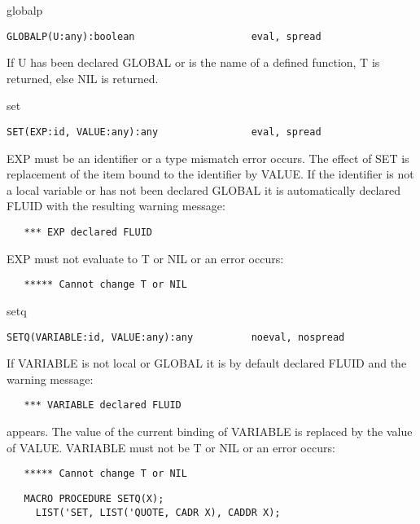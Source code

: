 \begin{Function}{globalp}
\begin{verbatim}
GLOBALP(U:any):boolean                    eval, spread
\end{verbatim}
   If  U has  been declared  GLOBAL or is  the name  of a defined
   function, T is returned, else NIL is returned.
\end{Function}
\begin{Function}{set}
\begin{verbatim}
SET(EXP:id, VALUE:any):any                eval, spread
\end{verbatim}
   EXP  must be  an identifier or  a type  mismatch error occurs.
   The  effect  of  SET  is  replacement  of  the  item bound  to
   the  identifier by  VALUE. If  the identifier  is not  a local
   variable  or has not been  declared GLOBAL it is automatically
   declared FLUID with the resulting warning message:
\begin{verbatim}
   *** EXP declared FLUID
\end{verbatim}
   EXP must not evaluate to T or NIL or an error occurs:
\begin{verbatim}
   ***** Cannot change T or NIL
\end{verbatim}
\end{Function}
\begin{Function}{setq}
\begin{verbatim}
SETQ(VARIABLE:id, VALUE:any):any          noeval, nospread
\end{verbatim}
   If  VARIABLE is not local or  GLOBAL it is by default declared
   FLUID and the warning message:
\begin{verbatim}
   *** VARIABLE declared FLUID
\end{verbatim}
   appears.    The value  of the  current binding of  VARIABLE is
   replaced  by the value of VALUE. VARIABLE must not be T or NIL
   or an error occurs:
\begin{verbatim}
   ***** Cannot change T or NIL
\end{verbatim}

\begin{verbatim}
   MACRO PROCEDURE SETQ(X);
     LIST('SET, LIST('QUOTE, CADR X), CADDR X);
\end{verbatim}
\end{Function}
